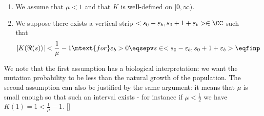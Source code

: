 \begin{hypothesis}\label{hyp:boundK}
    \begin{enumerate}
        \item We assume that $\mu < 1$ and that $K$ is well-defined on $[0, \infty)$.   
        \item We suppose there exists a vertical strip $<s_0-\varepsilon_b, s_0+1+\varepsilon_b> \in \CC$ such that 
        $$|K(\Re(s))| < \frac{1}{\mu} - 1
        \mtext{for } \varepsilon_b > 0 \eqsepv s \in <s_0-\varepsilon_b, s_0+1+\varepsilon_b>\eqfinp$$ 
    \end{enumerate}
\end{hypothesis}
We note that the first assumption has a biological interpretation: we want the mutation probability to be less than the natural growth of the population. The second assumption can also be justified by the same argument: it means that $\mu$ is small enough so that  such an interval exists - for instance if $\mu<\frac{1}{2}$ we have $K(1)=1<\frac{1}{\mu}-1.$  []

